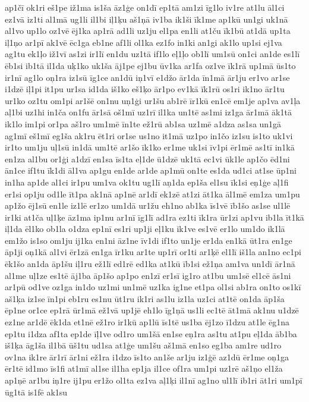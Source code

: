 {ap1čī
ok1ri
eš1pe
iž1ma
is1ša
āz1ģe
on1dī
ep1tā
am1zi
īg1lo
iv1re
at1lu
āl1ci
ez1vā
iz1ti
al1mā
ug1li
il1bi
iļ1ķu
aš1ņā
iv1ba
ik1ši
īk1me
ap1kū
un1gi
uk1nā
al1vo
up1lo
oz1vē
ēj1ka
ap1rā
ad1li
uz1ju
el1pa
en1li
at1ču
īk1bū
at1dā
up1ta
iļ1ņo
ar1pī
ak1vē
ēc1ga
eb1ne
af1li
ol1ka
ez1fo
in1ki
an1gi
ak1lo
up1si
ej1va
ag1tu
ek1ļo
iž1vī
as1zi
ir1lī
en1du
uz1tā
if1lo
eļ1ļo
ob1lī
um1sū
on1ci
an1de
es1lī
ēb1si
ib1tā
il1da
uķ1ko
uk1ša
āj1pe
ej1bu
ūv1ka
ar1fa
oz1ve
īk1rā
up1mā
ūs1to
ir1nī
ag1lo
oņ1ra
iz1sū
īg1ce
an1dū
iņ1vī
e1džo
ār1da
īn1mā
ār1ju
er1vo
ar1se
i1dzē
iļ1pi
it1pu
ur1sa
id1da
iš1ko
eš1ķo
ār1po
ev1kā
īk1rū
os1ri
ik1no
ār1tu
ur1ko
oz1tu
om1pi
ar1šē
on1nu
uņ1ģi
ur1šu
ab1rē
īr1kū
en1cē
em1je
ap1va
av1ļa
aļ1bi
uz1hi
in1ča
on1fu
ār1sā
oš1mī
uz1rī
il1ka
un1tē
as1mi
iz1ga
ār1mā
āk1tā
ik1lo
im1pi
or1pa
aš1ro
um1mē
īn1te
ež1rū
ab1sa
uz1mē
a1dza
as1sa
un1gā
ag1mī
eš1mī
eg1ša
ak1ru
ēt1ri
or1se
us1no
it1mā
uz1po
in1čo
iz1su
is1to
uk1vi
ir1to
um1ju
uļ1sū
in1dā
um1tē
ar1šo
īk1ko
er1me
uk1si
īv1pi
ēr1mē
as1tī
in1kā
en1za
al1bu
or1ģi
a1dzī
en1sa
īs1ta
eļ1de
ū1dzē
uk1tā
ec1vi
ūk1le
ap1čo
ēd1ni
ān1ce
if1tu
īk1di
āl1va
ap1gu
en1de
ar1de
ap1mū
on1te
es1da
ud1ci
at1se
ūp1ni
in1ha
ap1de
al1ci
ir1pu
um1va
ok1tu
ug1lī
aņ1da
ep1ša
el1su
īk1si
eņ1ģe
aļ1fi
er1si
op1ju
od1le
īt1pa
ak1nā
ap1nē
ar1dī
ek1zē
at1zi
āt1ka
āl1mē
em1za
um1pu
ap1žo
ēj1sū
en1le
iz1lē
er1zo
um1dā
ur1žu
eh1no
ab1ka
īs1vē
īb1šo
as1se
ul1lē
ir1ki
at1ča
uļ1ķe
āz1ma
ip1nu
ar1nī
īg1lī
ad1ra
ez1ti
īk1ra
ūr1zi
ap1vu
ib1la
īt1kā
iļ1da
ēl1ko
ob1la
o1dza
ep1nī
es1ri
up1ji
eļ1ku
ik1ve
es1vē
er1lo
um1do
ik1lā
em1žo
is1so
om1ju
ij1ka
en1ni
āz1ne
īv1di
if1to
un1je
er1da
en1kā
ūt1ra
en1ge
āp1ji
oņ1kā
al1vi
ēr1zā
en1ga
īr1ku
ar1te
up1rī
or1ti
ar1ķē
el1lī
iš1la
an1no
ec1pi
ēk1šo
an1da
āp1šu
iļ1ru
ež1lī
ed1rē
ed1ka
at1kū
īb1si
ež1ņa
am1va
un1dī
ār1nā
al1me
uļ1ze
es1tē
āj1ba
āp1šo
ap1po
en1zī
er1sī
ig1ro
at1bu
um1sē
el1cē
ās1ni
ar1pū
od1ve
oz1ga
in1do
uz1mi
un1mē
uz1ka
ig1ne
et1pa
ol1si
ab1ra
on1to
os1kī
aš1ķa
iz1se
īn1pi
eb1ru
es1nu
ūt1ru
ik1ri
as1lu
iz1la
uz1ci
at1tē
on1da
āp1ša
ēp1ne
or1ce
ep1rā
ūr1mā
ež1vā
up1jē
eh1lo
īg1ņā
us1li
ec1tē
āt1mā
ak1nu
u1dzē
ez1ne
ar1dē
ēk1da
et1nē
ež1ro
ir1kū
ap1lū
īs1tē
us1ba
ēj1zo
ī1dzu
at1le
ēg1na
ep1tu
i1dza
af1ta
ep1de
īļ1ve
od1ro
um1šā
en1se
eņ1ra
as1tu
at1pu
eļ1da
āb1ba
iš1ķa
āg1ša
il1bā
ūš1tu
ud1sa
at1ģe
um1šu
aš1mā
en1so
eg1ba
am1re
ud1ro
ov1na
ik1re
ār1rī
ār1ni
ež1ra
i1dzo
īs1to
an1še
ar1ju
iz1ģē
az1dū
ēr1me
oņ1ga
ēr1tē
id1mo
īs1fi
at1mī
al1se
il1ha
ep1ja
il1ce
of1ra
um1pi
uz1rē
aš1ņo
el1ža
ap1ņē
ar1bu
iņ1re
ij1pu
er1žo
ol1ta
ez1va
aļ1ķi
il1nī
ag1no
ul1lī
ib1ri
āt1ri
um1pī
ūg1tā
is1fē
ak1su
}
